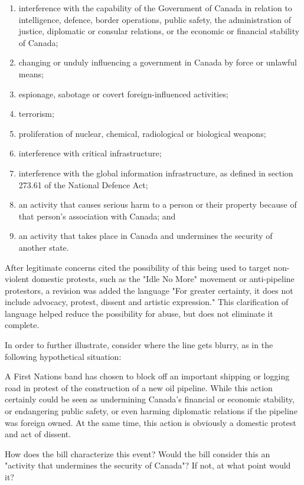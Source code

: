 \documentclass[a4paper, 11pt]{article} %
\begin{document}
\begin{enumerate}
    \item interference with the capability of the Government of Canada in relation to intelligence, defence, border operations, public safety, the administration of justice, diplomatic or consular relations, or the economic or financial stability of Canada;
    \item changing or unduly influencing a government in Canada by force or unlawful means;
    \item espionage, sabotage or covert foreign-influenced activities;
    \item terrorism;
    \item proliferation of nuclear, chemical, radiological or biological weapons;
    \item interference with critical infrastructure;
    \item interference with the global information infrastructure, as defined in section 273.61 of the National Defence Act;
    \item an activity that causes serious harm to a person or their property because of that person's association with Canada; and
    \item an activity that takes place in Canada and undermines the security of another state.
\end{enumerate}

After legitimate concerns cited the possibility of this being used to target non-violent domestic protests, such as the "Idle No More" movement or anti-pipeline protestors, a revision was added the language "For greater certainty, it does not include advocacy, protest, dissent and artistic expression." This clarification of language helped reduce the possibility for abuse, but does not eliminate it complete.

In order to further illustrate, consider where the line gets blurry, as in the following hypothetical situation:

A First Nations band has chosen to block off an important shipping or logging road in protest of the construction of a new oil pipeline. While this action certainly could be seen as undermining Canada's financial or economic stability, or endangering public safety, or even harming diplomatic relations if the pipeline was foreign owned. At the same time, this action is obviously a domestic protest and act of dissent.

How does the bill characterize this event? Would the bill consider this an "activity that undermines the security of Canada"? If not, at what point would it?
\end{document}
